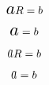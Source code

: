 \documentclass{article}
\begin{document}
\[ \scalerel{a}{R} = b \]
\[ \scalerel*[2em]{a}{R} = b \]
\[ \stretchrel{a}{R} = b \]
\[ \stretchrel*[200]{a}{R} = b \]
\end{document}
